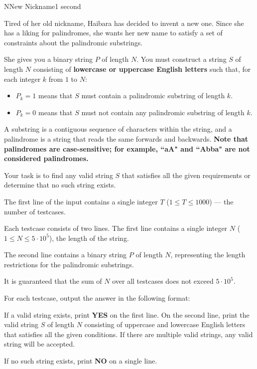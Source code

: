 \begin{problem}{N}{New Nickname}{1 second}

\noindent
Tired of her old nickname, Haibara has decided to invent a new one. Since she has a liking for palindromes, she wants her new name to satisfy a set of constraints about the palindromic substrings.

\noindent
She gives you a binary string $P$ of length $N$. You must construct a string $S$ of length $N$ consisting of \textbf{lowercase or uppercase English letters} such that, for each integer $k$ from $1$ to $N$:

\begin{itemize}
\item $P_k = 1$ means that $S$ must contain a palindromic substring of length $k$.
\item $P_k = 0$ means that $S$ must not contain any palindromic substring of length $k$.
\end{itemize}

\noindent
A substring is a contiguous sequence of characters within the string, and a palindrome is a string that reads the same forwards and backwards. \textbf{Note that palindromes are case-sensitive; for example, ``aA" and ``Abba" are not considered palindromes.}

\noindent
Your task is to find any valid string $S$ that satisfies all the given requirements or determine that no such string exists.

\InputFile

\noindent
The first line of the input contains a single integer $T$ ($1 \le T \le 1000$) --- the number of testcases.

\noindent
Each testcase consists of two lines. The first line contains a single integer $N$ ($1 \le N \le 5 \cdot 10^5$), the length of the string.

\noindent
The second line contains a binary string $P$ of length $N$, representing the length restrictions for the palindromic substrings.

\noindent
It is guaranteed that the sum of $N$ over all testcases does not exceed $5 \cdot 10^5$.

\OutputFile

\noindent
For each testcase, output the answer in the following format:

\noindent
If a valid string exists, print \textbf{YES} on the first line. On the second line, print the valid string $S$ of length $N$ consisting of uppercase and lowercase English letters that satisfies all the given conditions. If there are multiple valid strings, any valid string will be accepted.

\noindent
If no such string exists, print \textbf{NO} on a single line.

\Examples

\begin{example}
\end{example}

\pagebreak

\end{problem}
